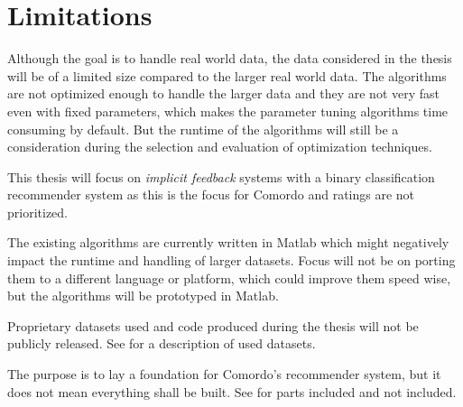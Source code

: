 
\section{Limitations}\label{sec:intro:limitations}


Although the goal is to handle real world data, the data considered in the thesis will be of a limited size compared to the larger real world data. The algorithms are not optimized enough to handle the larger data and they are not very fast even with fixed parameters, which makes the parameter tuning algorithms time consuming by default. But the runtime of the algorithms will still be a consideration during the selection and evaluation of optimization techniques.

This thesis will focus on \textit{implicit feedback} systems with a binary classification recommender system as this is the focus for Comordo and ratings are not prioritized.

The existing algorithms are currently written in Matlab which might negatively impact the runtime and handling of larger datasets. Focus will not be on porting them to a different language or platform, which could improve them speed wise, but the algorithms will be prototyped in Matlab.

Proprietary datasets used and code produced during the thesis will not be publicly released. See  for a description of used datasets.

The purpose is to lay a foundation for Comordo's recommender system, but it does not mean everything shall be built. See  for parts included and not included.

